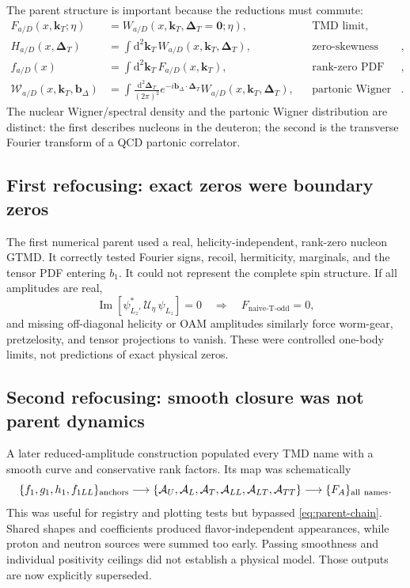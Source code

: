 \documentclass[11pt]{article}
\newcommand{\kT}{\bm{k}_{T}}
\newcommand{\DT}{\bm{\Delta}_{T}}
\newcommand{\dd}{\mathrm{d}}
\begin{document}
The parent structure is important because the reductions must commute:
\begin{align}
F_{a/D}(x,\kT;\eta)
  &= W_{a/D}(x,\kT,\DT=\bm 0;\eta),
  &&\text{TMD limit}, \label{eq:tmd-limit}\\
H_{a/D}(x,\DT)
  &= \int \dd^2\kT\,W_{a/D}(x,\kT,\DT),
  &&\text{zero-skewness GPD limit}, \label{eq:gpd-limit}\\
f_{a/D}(x)
  &= \int \dd^2\kT\,F_{a/D}(x,\kT),
  &&\text{rank-zero PDF limit}, \label{eq:pdf-limit}\\
\mathcal W_{a/D}(x,\kT,\bm b_\Delta)
  &= \int\frac{\dd^2\DT}{(2\pi)^2}
       e^{-i\bm b_\Delta\cdot\DT}W_{a/D}(x,\kT,\DT),
  &&\text{partonic Wigner transform}.
\label{eq:wigner}
\end{align}
The nuclear Wigner/spectral density and the partonic Wigner distribution
are distinct: the first describes nucleons in the deuteron; the second is
the transverse Fourier transform of a QCD partonic correlator.

\subsection{First refocusing: exact zeros were boundary zeros}

The first numerical parent used a real, helicity-independent, rank-zero
nucleon GTMD.  It correctly tested Fourier signs, recoil, hermiticity,
marginals, and the tensor PDF entering \(b_1\).  It could not represent the
complete spin structure.  If all amplitudes are real,
\begin{equation}
\operatorname{Im}
\left[\psi_{L_z'}^\ast\,\mathcal U_\eta\,\psi_{L_z}\right]=0
\quad\Longrightarrow\quad
F_{\text{naive-T-odd}}=0,
\label{eq:real-zero}
\end{equation}
and missing off-diagonal helicity or OAM amplitudes similarly force
worm-gear, pretzelosity, and tensor projections to vanish.  These were
controlled one-body limits, not predictions of exact physical zeros.

\subsection{Second refocusing: smooth closure was not parent dynamics}

A later reduced-amplitude construction populated every TMD name with a
smooth curve and conservative rank factors.  Its map was schematically
\begin{equation}
\{f_1,g_1,h_1,f_{1LL}\}_{\rm anchors}
\longrightarrow
\{\mathcal A_U,\mathcal A_L,\mathcal A_T,
\mathcal A_{LL},\mathcal A_{LT},\mathcal A_{TT}\}
\longrightarrow
\{F_A\}_{\rm all\ names}.
\label{eq:bad-closure}
\end{equation}
This was useful for registry and plotting tests but bypassed
\cref{eq:parent-chain}.  Shared shapes and coefficients produced
flavor-independent appearances, while proton and neutron sources were
summed too early.  Passing smoothness and individual positivity ceilings
did not establish a physical model.  Those outputs are now explicitly
superseded.
\end{document}
